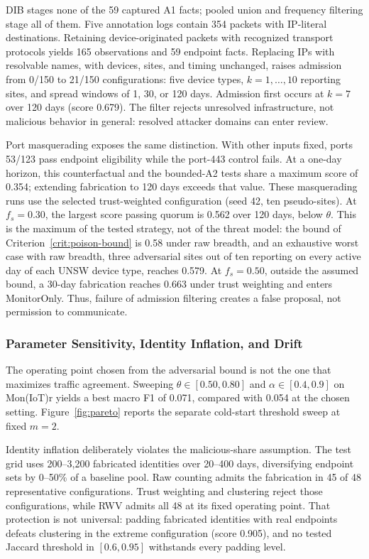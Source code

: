 \documentclass[journal]{IEEEtran}
\theoremstyle{definition}
\begin{document}
DIB stages none of the 59 captured A1 facts; pooled union and frequency filtering stage all of them. Five annotation logs contain 354 packets with IP-literal destinations. Retaining device-originated packets with recognized transport protocols yields 165 observations and 59 endpoint facts. Replacing IPs with resolvable names, with devices, sites, and timing unchanged, raises admission from 0/150 to 21/150 configurations: five device types, $k=1,\ldots,10$ reporting sites, and spread windows of 1, 30, or 120 days. Admission first occurs at $k=7$ over 120 days (score 0.679). The filter rejects unresolved infrastructure, not malicious behavior in general: resolved attacker domains can enter review.

Port masquerading exposes the same distinction. With other inputs fixed, ports 53/123 pass endpoint eligibility while the port-443 control fails. At a one-day horizon, this counterfactual and the bounded-A2 tests share a maximum score of 0.354; extending fabrication to 120 days exceeds that value. These masquerading runs use the selected trust-weighted configuration (seed 42, ten pseudo-sites). At $f_s=0.30$, the largest score passing quorum is 0.562 over 120 days, below $\theta$. This is the maximum of the tested strategy, not of the threat model: the bound of Criterion~\ref{crit:poison-bound} is 0.58 under raw breadth, and an exhaustive worst case with raw breadth, three adversarial sites out of ten reporting on every active day of each UNSW device type, reaches 0.579. At $f_s=0.50$, outside the assumed bound, a 30-day fabrication reaches 0.663 under trust weighting and enters MonitorOnly. Thus, failure of admission filtering creates a false proposal, not permission to communicate.

\subsubsection{Parameter Sensitivity, Identity Inflation, and Drift}
\label{sec:sensitivity-results}
The operating point chosen from the adversarial bound is not the one that maximizes traffic agreement. Sweeping $\theta\in[0.50,0.80]$ and $\alpha\in[0.4,0.9]$ on Mon(IoT)r yields a best macro F1 of 0.071, compared with 0.054 at the chosen setting. Figure~\ref{fig:pareto} reports the separate cold-start threshold sweep at fixed $m=2$.

Identity inflation deliberately violates the malicious-share assumption. The test grid uses 200--3,200 fabricated identities over 20--400 days, diversifying endpoint sets by 0--50\% of a baseline pool. Raw counting admits the fabrication in 45 of 48 representative configurations. Trust weighting and clustering reject those configurations, while RWV admits all 48 at its fixed operating point. That protection is not universal: padding fabricated identities with real endpoints defeats clustering in the extreme configuration (score 0.905), and no tested Jaccard threshold in $[0.6,0.95]$ withstands every padding level.
\end{document}

